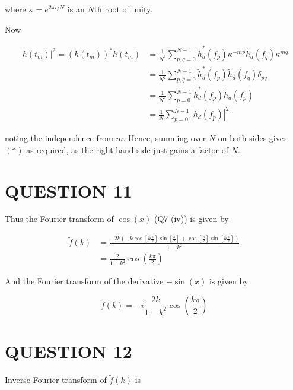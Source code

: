 \documentclass[a4paper]{article}
\begin{document}
where $ \kappa = e^{2\pi i / N} $ is an $ N $th root of unity.

Now

\begin{align*}
| h(t_{m}) |^{2} = (h(t_{m}))^{*} h(t_{m}) & = \frac{1}{N^{2}} \sum_{p,q = 0}^{N - 1}  \tilde{h}_{d}^{*}(f_{p}) \kappa^{-mp}  \tilde{h}_{d}(f_{q}) \kappa^{mq}   \\
& = \frac{1}{N^{2}} \sum_{p,q = 0}^{N - 1}  \tilde{h}_{d}^{*}(f_{p})	 \tilde{h}_{d}(f_{q})  \delta_{pq} \\
& = \frac{1}{N^{2}} \sum_{p = 0}^{N - 1}  \tilde{h}_{d}^{*}(f_{p})	 \tilde{h}_{d}(f_{p}) \\
& = \frac{1}{N} \sum_{p=0}^{N-1} | h_{d}(f_{p}) |^{2} 
\end{align*}

noting the independence from $ m $. Hence, summing over $ N $ on both sides gives $ (*) $ as required, as the right hand side just gains a factor of $ N $.

\section{QUESTION 11}


	Thus the Fourier transform of $ \cos(x) $ (Q7 (iv)) is given by

\begin{align*}
\tilde{f}(k) & = \frac{-2k \left(  - k \cos[k \frac{\pi}{2}]\sin[ \frac{\pi}{2} ] + \cos[ \frac{\pi}{2}]\sin[k \frac{\pi}{2}]   \right)}{1 - k^{2}}  \\
& =  \frac{2}{1-k^{2}} \cos \left(    \frac{k \pi}{2} \right) 
\end{align*}

And the Fourier transform of the derivative $ -\sin(x) $ is given by

\[ \tilde{f}(k) = - i \frac{2k}{1-k^{2}} \cos \left(   \frac{k \pi}{2} \right) \]





\section{QUESTION 12}

Inverse Fourier transform of $ \tilde{f}(k) $ is
\end{document}
